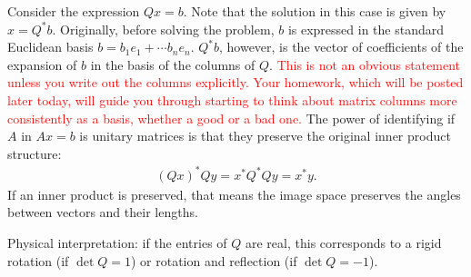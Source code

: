 \documentclass{ximera}
\begin{document}
Consider the expression $Qx = b$.  Note that the solution in this case is given by $x = Q^*b$.  Originally, before solving the problem, $b$ is expressed in the standard Euclidean basis $b = b_1e_1 + \cdots b_ne_n$.   $Q^*b$, however, is the vector of coefficients of the expansion of $b$ in the basis of the columns of $Q$.  \textcolor{red}{This is not an obvious statement unless you write out the columns explicitly.  Your homework, which will be posted later today, will guide you through starting to think about matrix columns more consistently as a basis, whether a good or a bad one.}
The power of identifying if $A$ in $Ax=b$ is unitary matrices is that they preserve the original inner product structure:
\begin{align}
    (Qx)^*Qy = x^*Q^*Qy = x^*y.
\end{align}
If an inner product is preserved, that means the image space preserves the angles between vectors and their lengths. 

Physical interpretation: if the entries of $Q$ are real, this corresponds to a rigid rotation (if $\det Q = 1$) or rotation and reflection (if $\det Q = -1$).
\end{document}
